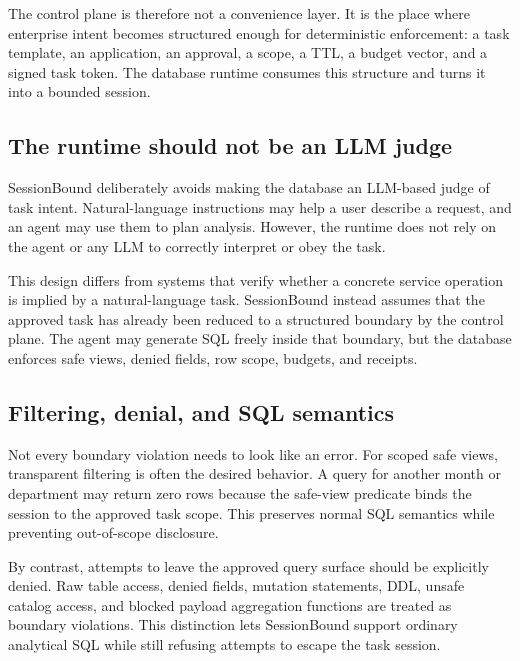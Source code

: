 \documentclass[journal]{IEEEtran}
\begin{document}
The control plane is therefore not a convenience layer. It is the place
where enterprise intent becomes structured enough for deterministic
enforcement: a task template, an application, an approval, a scope, a
TTL, a budget vector, and a signed task token. The database runtime
consumes this structure and turns it into a bounded session.

\hypertarget{the-runtime-should-not-be-an-llm-judge}{%
\subsection{The runtime should not be an LLM
judge}\label{the-runtime-should-not-be-an-llm-judge}}

SessionBound deliberately avoids making the database an LLM-based judge
of task intent. Natural-language instructions may help a user describe a
request, and an agent may use them to plan analysis. However, the
runtime does not rely on the agent or any LLM to correctly interpret or
obey the task.

This design differs from systems that verify whether a concrete service
operation is implied by a natural-language task. SessionBound instead
assumes that the approved task has already been reduced to a structured
boundary by the control plane. The agent may generate SQL freely inside
that boundary, but the database enforces safe views, denied fields, row
scope, budgets, and receipts.

\hypertarget{filtering-denial-and-sql-semantics}{%
\subsection{Filtering, denial, and SQL
semantics}\label{filtering-denial-and-sql-semantics}}

Not every boundary violation needs to look like an error. For scoped
safe views, transparent filtering is often the desired behavior. A query
for another month or department may return zero rows because the
safe-view predicate binds the session to the approved task scope. This
preserves normal SQL semantics while preventing out-of-scope disclosure.

By contrast, attempts to leave the approved query surface should be
explicitly denied. Raw table access, denied fields, mutation statements,
DDL, unsafe catalog access, and blocked payload aggregation functions
are treated as boundary violations. This distinction lets SessionBound
support ordinary analytical SQL while still refusing attempts to escape
the task session.
\end{document}
